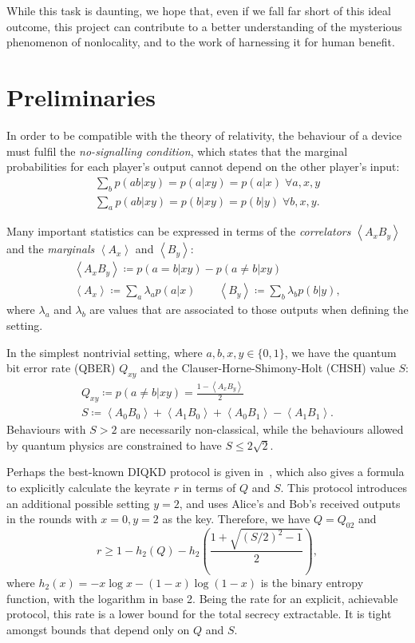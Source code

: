 \documentclass[10pt, a4paper]{article}
\newcommand{\?}{\mathrel{?}} %
\newcommand{\angleb}[1]{\left\langle #1 \right\rangle} %
\numberwithin{equation}{section} %
\theoremstyle{definition}
\theoremstyle{plain}
\theoremstyle{plain}
\begin{document}
  While this task is daunting, we hope that, even if we fall far short of this ideal outcome, this project can contribute to a better understanding of the mysterious phenomenon of nonlocality, and to the work of harnessing it for human benefit.

  \section{Preliminaries}

  In order to be compatible with the theory of relativity, the behaviour of a device must fulfil the \emph{no-signalling condition}, which states that the marginal probabilities for each player's output cannot depend on the other player's input:
  \begin{gather}
    \sum_b p(ab|xy) = p(a|xy) = p(a|x)\;\forall a,x,y \\
    \sum_a p(ab|xy) = p(b|xy) = p(b|y)\;\forall b,x,y.
  \end{gather}

  Many important statistics can be expressed in terms of the \emph{correlators} \(\angleb{A_x B_y}\) and the \emph{marginals} \(\angleb{A_x}\) and \(\angleb{B_y}\):
  \begin{gather}
    \angleb{A_x B_y} \coloneqq p(a=b|xy) - p(a\neq b|xy) \\
    \angleb{A_x} \coloneqq \sum_a \lambda_a p(a|x) \qquad \angleb{B_y} \coloneqq \sum_b \lambda_b p(b|y),
  \end{gather}
  where \(\lambda_a\) and \(\lambda_b\) are values that are associated to those outputs when defining the setting.

  In the simplest nontrivial setting, where \(a,b,x,y \in \{0,1\}\), we have the quantum bit error rate (QBER) \(Q_{xy}\) and the Clauser-Horne-Shimony-Holt (CHSH) value \(S\):
  \begin{gather}
    Q_{xy} \coloneqq p(a \neq b|xy) = \frac{1-\angleb{A_x B_y}}{2} \\
    S \coloneqq \angleb{A_0 B_0} + \angleb{A_1 B_0} + \angleb{A_0 B_1} - \angleb{A_1 B_1}.
  \end{gather}
  Behaviours with \(S > 2\) are necessarily non-classical, while the behaviours allowed by quantum physics are constrained to have \(S \leq 2\sqrt{2}\).

  Perhaps the best-known DIQKD protocol is given in~\cite{DIQKD_Lower}, which also gives a formula to explicitly calculate the keyrate \(r\) in terms of \(Q\) and \(S\). This protocol introduces an additional possible setting \(y = 2\), and uses Alice's and Bob's received outputs in the rounds with \(x = 0, y = 2\) as the key. Therefore, we have \(Q = Q_{02}\) and
  \begin{equation}
    r \geq 1 - h_2(Q) - h_2\left( \frac{1 + \sqrt{{(S/2)}^2-1}}{2} \right),
  \end{equation}
  where \(h_2(x) = - x \log x - (1-x) \log (1-x)\) is the binary entropy function, with the logarithm in base 2. Being the rate for an explicit, achievable protocol, this rate is a lower bound for the total secrecy extractable. It is tight amongst bounds that depend only on \(Q\) and \(S\).
\end{document}
